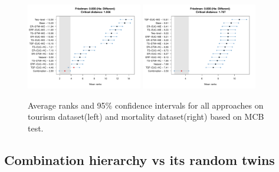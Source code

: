 \documentclass[a4paper,review,12pt,authoryear]{elsarticle}
\begin{document}
\begin{figure}[!h]
    \centering
    \includegraphics[width=0.45\textwidth]{figures/hierarchy_rmsse/tourism/P4_benchmarks_h12.pdf}
    \includegraphics[width=0.45\textwidth]{figures/hierarchy_rmsse/mortality/P4_benchmarks_h12.pdf}
    \caption{Average ranks and 95\% confidence intervals for all approaches on tourism dataset(left) and mortality dataset(right) based on MCB test.}
    \label{fig:P4_bench_mcb}
\end{figure}


\subsection{Combination hierarchy vs its random twins}
\end{document}
